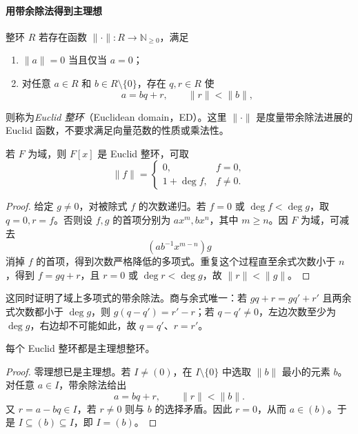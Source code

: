 \documentclass[lang=cn,a4paper,fontset=none,zihao=false,10pt,openany,twoside]{beautybook}
\numberwithin{algorithm}{chapter}
\begin{document}
\paragraph{用带余除法得到主理想}
\begin{definition}[Euclid 整环]
整环 $R$ 若存在函数 $\|\cdot\|:R\to\mathbb N_{\ge0}$，满足
\begin{enumerate}[(1)]
\item $\|a\|=0$ 当且仅当 $a=0$；
\item 对任意 $a\in R$ 和 $b\in R\setminus\{0\}$，存在 $q,r\in R$ 使
\[
 a=bq+r,\qquad \|r\|<\|b\|,
\]
\end{enumerate}
则称为\emph{Euclid 整环}（Euclidean domain，ED）。这里 $\|\cdot\|$ 是度量带余除法进展的 Euclid 函数，不要求满足向量范数的性质或乘法性。
\end{definition}

\begin{example}
若 $F$ 为域，则 $F[x]$ 是 Euclid 整环，可取
\[
 \|f\|=\begin{cases}0,&f=0,\\1+\deg f,&f\ne0.\end{cases}
\]
\end{example}
\begin{proof}
给定 $g\ne0$，对被除式 $f$ 的次数递归。若 $f=0$ 或 $\deg f<\deg g$，取 $q=0,r=f$。否则设 $f,g$ 的首项分别为 $ax^m,bx^n$，其中 $m\ge n$。因 $F$ 为域，可减去
\[
 (ab^{-1}x^{m-n})g
\]
消掉 $f$ 的首项，得到次数严格降低的多项式。重复这个过程直至余式次数小于 $n$，得到 $f=gq+r$，且 $r=0$ 或 $\deg r<\deg g$，故 $\|r\|<\|g\|$。
\end{proof}
这同时证明了域上多项式的带余除法。商与余式唯一：若 $gq+r=gq'+r'$ 且两余式次数都小于 $\deg g$，则 $g(q-q')=r'-r$；若 $q-q'\ne0$，左边次数至少为 $\deg g$，右边却不可能如此，故 $q=q'$、$r=r'$。

\Needspace{45mm}
\begin{theorem}
每个 Euclid 整环都是主理想整环。
\end{theorem}
\begin{proof}
零理想已是主理想。若 $I\ne(0)$，在 $I\setminus\{0\}$ 中选取 $\|b\|$ 最小的元素 $b$。对任意 $a\in I$，带余除法给出
\[
 a=bq+r,\qquad \|r\|<\|b\|.
\]
又 $r=a-bq\in I$，若 $r\ne0$ 则与 $b$ 的选择矛盾。因此 $r=0$，从而 $a\in(b)$。于是 $I\subseteq(b)\subseteq I$，即 $I=(b)$。
\end{proof}
\end{document}
